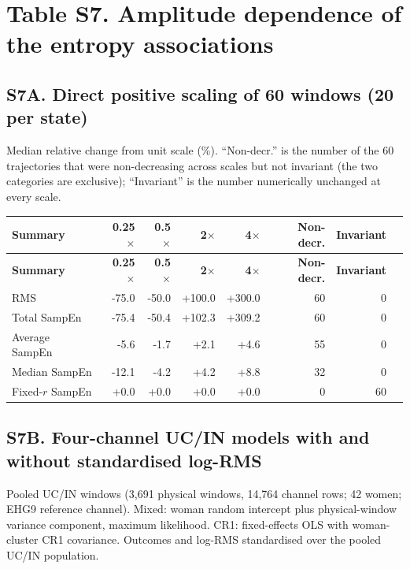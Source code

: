 \documentclass[10pt]{article}
\begin{document}
\section*{Table S7. Amplitude dependence of the entropy associations}\label{tab:s7_amplitude}
\subsection*{S7A. Direct positive scaling of 60 windows (20 per state)}
Median relative change from unit scale (\%). ``Non-decr.'' is the number of the 60 trajectories that were non-decreasing across scales but not invariant (the two categories are exclusive); ``Invariant'' is the number numerically unchanged at every scale.
\begin{longtable}{p{3.2cm}rrrrrrr}
\toprule
\textbf{Summary} & \textbf{0.25$\times$} & \textbf{0.5$\times$} & \textbf{2$\times$} & \textbf{4$\times$} & \textbf{Non-decr.} & \textbf{Invariant} \\
\midrule
\endfirsthead
\toprule
\textbf{Summary} & \textbf{0.25$\times$} & \textbf{0.5$\times$} & \textbf{2$\times$} & \textbf{4$\times$} & \textbf{Non-decr.} & \textbf{Invariant} \\
\midrule
\endhead
RMS & -75.0 & -50.0 & +100.0 & +300.0 & 60 & 0 \\
Total SampEn & -75.4 & -50.4 & +102.3 & +309.2 & 60 & 0 \\
Average SampEn & -5.6 & -1.7 & +2.1 & +4.6 & 55 & 0 \\
Median SampEn & -12.1 & -4.2 & +4.2 & +8.8 & 32 & 0 \\
Fixed-$r$ SampEn & +0.0 & +0.0 & +0.0 & +0.0 & 0 & 60 \\
\bottomrule
\end{longtable}
\subsection*{S7B. Four-channel UC/IN models with and without standardised log-RMS}
Pooled UC/IN windows (3,691 physical windows, 14,764 channel rows; 42 women; EHG9 reference channel). Mixed: woman random intercept plus physical-window variance component, maximum likelihood. CR1: fixed-effects OLS with woman-cluster CR1 covariance. Outcomes and log-RMS standardised over the pooled UC/IN population.
\end{document}
